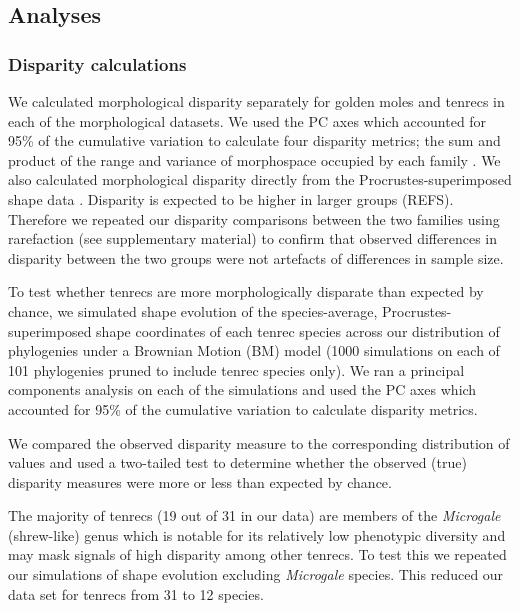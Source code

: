 \documentclass[12pt,a4paper]{article}
\begin{document}
\subsection{Analyses}
\subsubsection{Disparity calculations} 

We calculated morphological disparity separately for golden moles and tenrecs in each of the morphological datasets. We used the PC axes which accounted for 95\% of the cumulative variation to calculate four disparity metrics; the sum and product of the range and variance of morphospace occupied by each family \citep{Brusatte2008, Foth2012, Ruta2013}. We also calculated morphological disparity directly from the Procrustes-superimposed shape data \citep{Zelditch2012}. 
Disparity is expected to be higher in larger groups (REFS). Therefore we repeated our disparity comparisons between the two families using rarefaction (see supplementary material) to confirm that observed differences in disparity between the two groups were not artefacts of differences in sample size.

To test whether tenrecs are more morphologically disparate than expected by chance, we simulated shape evolution  \citep{Harmon2008} of the species-average, Procrustes-superimposed shape coordinates of each tenrec species across our distribution of phylogenies under a Brownian Motion (BM) model (1000 simulations on each of 101 phylogenies pruned to include tenrec species only). We ran a principal components analysis on each of the simulations and used the PC axes which accounted for 95\% of the cumulative variation to calculate disparity metrics.

We compared the observed disparity measure to the corresponding distribution of values and used a two-tailed test to determine whether the observed (true) disparity measures were more or less than expected by chance.

The majority of tenrecs (19 out of 31 in our data) are members of the \textit{Microgale} (shrew-like) genus which is notable for its relatively low phenotypic diversity \citep{ Soarimalala2011, Jenkins2003} and may mask signals of high disparity among other tenrecs. To test this we repeated our simulations of shape evolution excluding \textit{Microgale} species. This reduced our data set for tenrecs from 31 to 12 species. 
\end{document}
